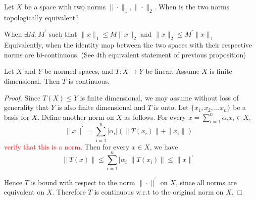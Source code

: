 \begin{note}
  Let $X$ be a space with two norms $\|\cdot\|_1, \|\cdot\|_2$. When
  is the two norms topologically equivalent?

  When $\exists M, M^\prime$ such that $\|x\|_1 \le M \|x\|_2$ and
  $\|x\|_2 \le M^\prime \|x\|_1$
  Equivalently, when the identity map between the two spaces with
  their respective norms are bi-continuous. (See 4th equivalent
  statement of previous proposition)
\end{note}
\begin{theorem}
  Let $X$ and $Y$ be normed spaces, and $T: X \to Y$ be linear.
  Assume $X$ is finite dimensional. Then $T$ is continuous.
\end{theorem}
\begin{proof}
  Since $T(X) \le Y$ is finite dimensional, we may assume without
  loss of generality that $Y$ is also finite dimensional and $T$ is
  onto. Let $\{ x_1, x_2, \ldots x_n \}$ be a basis for $X$. Define
  another norm on $X$ as follows. For every $x  = \sum_{i = 1}^{n}
  \alpha_i x_i \in X$, \[
    \|x\|^\prime = \sum_{i = 1}^{n} |\alpha_i| (\|T(x_i)\| + \|x_i\|)
  \]
  \textcolor{red}{verify that this is a norm}. Then for every $x \in
  X$, we have \[
    \|T(x)\| \le \sum_{i = 1}^{n} |\alpha_i|\|T(x_i)\| \le \|x\|^\prime
  \]

  Hence $T$ is bound with respect to the norm $\|\cdot\|^\prime$ on
  $X$, since all norms are equivalent on $X$. Therefore $T$ is
  continuous w.r.t to the original norm on $X$.
\end{proof}

